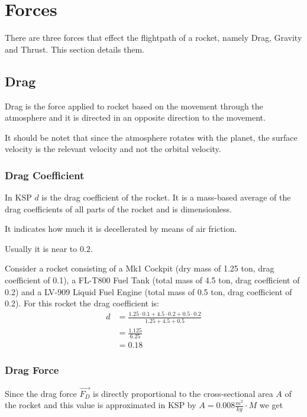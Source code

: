 \documentclass[11pt]{report}
\newcommand{\oa}[1]{\overrightarrow{#1}}
\newcommand{\F}[1]{\oa{F_{#1}}}
\begin{document}
\chapter{Forces}

There are three forces that effect the flightpath of a rocket, namely
Drag, Gravity and Thrust. This section details them.

\section{Drag}

 Drag is the force applied to rocket based on the movement
through the atmosphere and it is directed in an opposite direction to
the movement.

It should be notet that since the atmosphere rotates with the planet,
the surface velocity is the relevant velocity and not the orbital
velocity.

\subsection{Drag Coefficient}

In KSP $d$ is the  drag coefficient of the
rocket. It is a mass-based average of the drag coefficients of all
parts of the rocket and is dimensionless.

It indicates how much it is decellerated by means of air friction.

Usually it is near to $0.2$.

Consider a rocket consisting of a Mk1 Cockpit (dry mass of 1.25 ton,
drag coefficient of 0.1), a FL-T800 Fuel Tank (total mass of 4.5 ton,
drag coefficient of 0.2) and a LV-909 Liquid Fuel Engine (total mass
of 0.5 ton, drag coefficient of 0.2). For this rocket the drag
coefficient is:
\begin{align}
  d &= \frac{1.25 \cdot 0.1 + 4.5 \cdot 0.2 + 0.5 \cdot 0.2}{ 1.25 + 4.5 + 0.5 }\nonumber\\
  &= \frac{1.125}{6.25}\nonumber\\
  &= 0.18\nonumber
\end{align}

\subsection{Drag Force}\label{DragForce}

Since the drag force $\F{D}$ is directly proportional to the
cross-sectional area $A$ of the rocket and this value is approximated
in KSP by $A = 0.008 \frac{m^2}{kg} \cdot M$ we get
\end{document}
